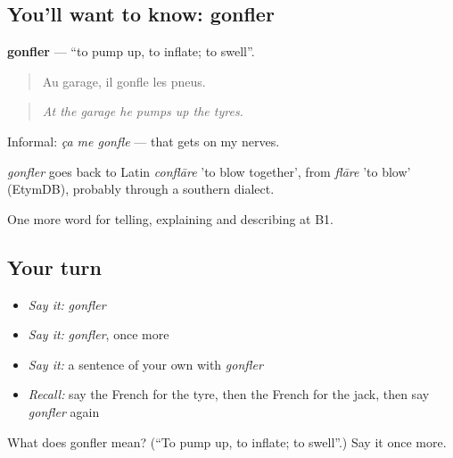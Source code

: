 \subsection*{You'll want to know: gonfler}
\textbf{gonfler} — \textquotedblleft{}to pump up, to inflate; to swell\textquotedblright{}.

\begin{quote}
Au garage, il gonfle les pneus.
\end{quote}

\begin{quote}
\emph{At the garage he pumps up the tyres.}
\end{quote}

Informal: \emph{ça me gonfle} — that gets on my nerves.

\begin{cousinweb}
\emph{gonfler} goes back to Latin \emph{conflāre} 'to blow together', from \emph{flāre} 'to blow' (EtymDB), probably through a southern dialect.
\end{cousinweb}

\begin{grammarlens}[title={What you've built}]
One more word for telling, explaining and describing at B1.
\end{grammarlens}

\subsection*{Your turn}
\begin{itemize}
\raggedright
  \item \emph{Say it:} \emph{gonfler}
  \item \emph{Say it:} \emph{gonfler}, once more
  \item \emph{Say it:} a sentence of your own with \emph{gonfler}
  \item \emph{Recall:} say the French for the tyre, then the French for the jack, then say \emph{gonfler} again
\end{itemize}

\begin{tcolorbox}[breakable,colback=teal!4,colframe=teal!35!black,title={Before you move on}]
What does gonfler mean? (\textquotedblleft{}To pump up, to inflate; to swell\textquotedblright{}.) Say it once more.
\end{tcolorbox}
